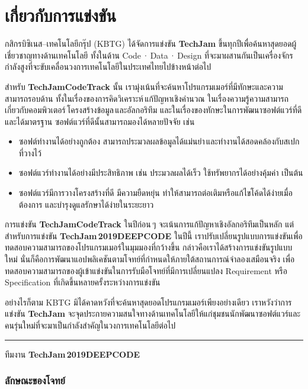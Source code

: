\chapter{เกี่ยวกับการแข่งขัน}

กสิกร\:บิซิเนส{\hrsp}–{\hrsp}เทคโนโลยี\:กรุ๊ป {\ltspc (KBTG)} ได้จัดการแข่งขัน \textbf{TechJam} ขึ้นทุกปีเพื่อค้นหาสุดยอดผู้เชี่ยวชาญทางด้านเทคโนโลยี ทั้งในด้าน Code\,·\,Data\,·\,Design ที่จะมาผสานกันเป็นเครื่องจักรกำลังสูงที่จะขับเคลื่อนวงการเทคโนโลยีในประเทศไทยไปข้างหน้าต่อไป

สำหรับ \textbf{TechJam\:Code\:Track} นั้น เรามุ่งเน้นที่จะค้นหาโปรแกรมเมอร์ที่มีทักษะและความสามารถรอบด้าน ทั้งในเรื่องของการคิดวิเคราะห์\,แก้ปัญหาเชิงคำนวณ ในเรื่องความรู้ความสามารถเกี่ยวกับคอมพิวเตอร์\,โครงสร้างข้อมูล\,และอัลกอริทึม และในเรื่องของทักษะในการพัฒนาซอฟต์แวร์ที่ดีและได้มาตรฐาน\;\;
ซอฟต์แวร์ที่ดีนั้นสามารถมองได้หลายปัจจัย เช่น

\begin{itemize}
\item  ซอฟต์ทำงานได้อย่างถูกต้อง สามารถประมวลผลข้อมูลได้แม่นยำ\,และทำงานได้สอดคล้องกับสเปกที่วางไว้
\item  ซอฟต์แวร์ทำงานได้อย่างมีประสิทธิภาพ เช่น ประมวลผลได้เร็ว ใช้ทรัพยากรได้อย่างคุ้มค่า เป็นต้น
\item  ซอฟต์แวร์มีการวางโครงสร้างที่ดี มีความยืดหยุ่น ทำให้สามารถต่อเติมหรือแก้ไขโค้ดได้ง่ายเมื่อต้องการ และบำรุงดูแลรักษาได้ง่ายในระยะยาว
\end{itemize} 

การแข่งขัน \textbf{TechJam\:Code\:Track} ในปีก่อน\,ๆ จะเน้นการแก้ปัญหาเชิงอัลกอริทึมเป็นหลัก\;\;
แต่สำหรับการแข่งขัน \textbf{TechJam\,2019\:DEEP\:CODE} ในปีนี้ เราปรับเปลี่ยนรูปแบบการแข่งขันเพื่อทดสอบความสามารถของโปรแกรมเมอร์ในมุมมองที่กว้างขึ้น\;\;
กล่าวคือเราได้สร้างการแข่งขันรูปแบบใหม่ นั่นก็คือการพัฒนาแอปพลิเคชันตามโจทย์ที่กำหนดให้ภายใต้สถานการณ์จำลองเสมือนจริง เพื่อทดสอบความสามารถของผู้เข้าแข่งขันในการรับมือโจทย์ที่มีการเปลี่ยนแปลง Requirement หรือ Specification ที่เกิดขึ้นหลายครั้งระหว่างการแข่งขัน

อย่างไรก็ตาม {\ltspc KBTG} มิได้คาดหวังที่จะค้นหาสุดยอดโปรแกรมเมอร์เพียงอย่างเดียว\;\;
เราหวังว่าการแข่งขัน \textbf{TechJam} จะจุดประกายความสนใจทางด้านเทคโนโลยีให้แก่ชุมชนนักพัฒนาซอฟต์แวร์และคนรุ่นใหม่ที่จะมาเป็นกำลังสำคัญในวงการเทคโนโลยีต่อไป

\vspace{2pc}
\hfill\rule[2.5pt]{2em}{0.75pt} ทีมงาน \textbf{TechJam\,2019\:DEEP\:CODE}

\subsection*{ลักษณะของโจทย์}

